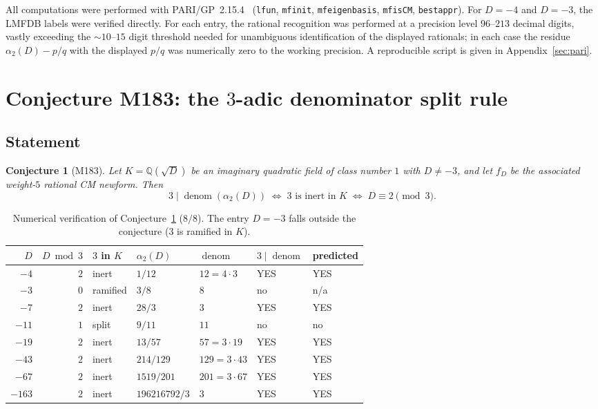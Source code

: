 \documentclass[12pt]{amsart}
\newtheorem{conjecture}[theorem]{Conjecture}
\theoremstyle{definition}
\DeclareMathOperator{\denom}{denom}
\newcommand{\Q}{\mathbb{Q}}
\begin{document}
All computations were performed with PARI/GP~2.15.4~\cite{PARI215}
(\texttt{lfun}, \texttt{mfinit}, \texttt{mfeigenbasis}, \texttt{mfisCM},
\texttt{bestappr}). For $D = -4$ and $D = -3$, the LMFDB labels were
verified directly. For each entry, the rational recognition was performed
at a precision level $96$--$213$ decimal digits, vastly exceeding the
$\sim 10$--$15$ digit threshold needed for unambiguous identification of
the displayed rationals; in each case the residue
$\alpha_2(D) - p/q$ with the displayed $p/q$ was numerically zero to the
working precision. A reproducible script is given in
Appendix~\ref{sec:pari}.

\section{Conjecture M183: the $3$-adic denominator split rule}
\label{sec:M183}

\subsection{Statement}

\begin{conjecture}[M183]\label{conj:M183}
Let $K = \Q(\sqrt{D})$ be an imaginary quadratic field of class number $1$
with $D \neq -3$, and let $f_D$ be the associated weight-$5$ rational
CM newform. Then
\[
  3 \mid \denom(\alpha_2(D)) \;\iff\; \text{$3$ is inert in $K$}
  \;\iff\; D \equiv 2 \pmod{3}.
\]
\end{conjecture}

\begin{table}[h]
  \caption{Numerical verification of Conjecture~\ref{conj:M183} ($8/8$).
  The entry $D=-3$ falls outside the conjecture (3 is ramified in $K$).}
  \label{tab:M183}
  \renewcommand{\arraystretch}{1.20}
  \begin{tabular}{rrlllll}
    \toprule
    $D$ & $D \bmod 3$ & $3$ in $K$ & $\alpha_2(D)$ & $\denom$ &
    $3 \mid \denom$ & predicted \\
    \midrule
    $-4$    & $2$ & inert    & $1/12$            & $12=4\cdot 3$  & YES & YES \\
    $-3$    & $0$ & ramified & $3/8$             & $8$            & no  & n/a \\
    $-7$    & $2$ & inert    & $28/3$            & $3$            & YES & YES \\
    $-11$   & $1$ & split    & $9/11$            & $11$           & no  & no  \\
    $-19$   & $2$ & inert    & $13/57$           & $57=3\cdot 19$ & YES & YES \\
    $-43$   & $2$ & inert    & $214/129$         & $129=3\cdot 43$& YES & YES \\
    $-67$   & $2$ & inert    & $1519/201$        & $201=3\cdot 67$& YES & YES \\
    $-163$  & $2$ & inert    & $196216792/3$     & $3$            & YES & YES \\
    \bottomrule
  \end{tabular}
\end{table}
\end{document}
